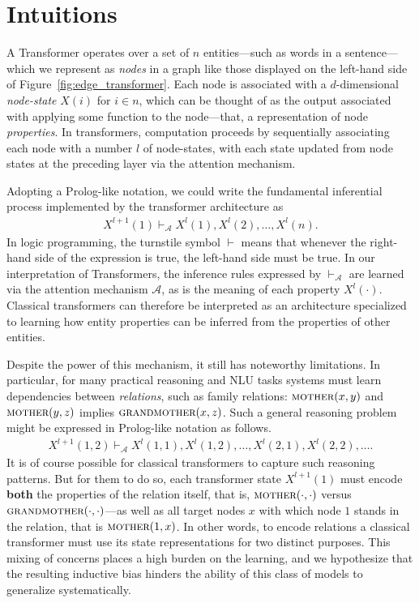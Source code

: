 \documentclass{article}
\newcommand{\fm}[1]{\textit{#1}}
\begin{document}
 \section{Intuitions}

 A Transformer operates over a set of $n$ entities---such as words in
 a sentence---which we represent as \fm{nodes} in a graph like those
 displayed on the left-hand side of
 Figure~\ref{fig:edge_transformer}. Each node is associated with a
 $d$-dimensional \fm{node-state} $X(i)$ for $i \in n$, which can be
 thought of as the output associated with applying some function to
 the node---that, a representation of node \fm{properties}. In
 transformers, computation proceeds by sequentially associating each
 node with a number $l$ of node-states, with each state updated from
 node states at the preceding layer via the attention mechanism.

 Adopting a Prolog-like notation, we could write the fundamental
 inferential process implemented by the transformer architecture as
\begin{align}
    X^{l +1}(1) \vdash_\mathcal{A} X^{l}(1), X^{l}(2), \dots, X^{l}(n).
    \label{eq:label1}
\end{align}
In logic programming, the turnstile symbol $\vdash$
means that whenever the right-hand side of the expression is true, the
left-hand side must be true. In our interpretation of Transformers,
the inference rules expressed by $\vdash_{\mathcal{A}}$ are learned
via the attention mechanism $\mathcal{A}$, as is the meaning of each
property $X^l(\cdot)$. Classical transformers can therefore be
interpreted as an architecture specialized to learning how entity
properties can be inferred from the properties of other entities.

Despite the power of this mechanism, it still has noteworthy
limitations. In particular, for many practical reasoning and NLU tasks
systems must learn dependencies between \textit{relations}, such as family
relations: $\textsc{mother}(x,y)$ and $\textsc{mother}(y,z)$ implies
$\textsc{grandmother}(x,z)$. Such a general reasoning problem might be
expressed in Prolog-like notation as follows.
\begin{align}
    X^{l +1}(1, 2) \vdash_\mathcal{A} X^{l}(1,1),  X^{l}(1,2),  \dots, X^{l}(2,1),  X^{l}(2,2), \dots.
    \label{eq:label1}
\end{align}
It is of course possible for classical transformers to capture such
reasoning patterns. But for them to do so, each transformer state
$X^{l +1}(1)$ must encode \textbf{both} the properties of the relation
itself, that is, $\textsc{mother}(\cdot,\cdot)$ versus
$\textsc{grandmother}(\cdot,\cdot)$---as well as all target nodes $x$
with which node $1$ stands in the relation, that is
$\textsc{mother}(1,x)$. In other words, to encode relations a
classical transformer must use its state representations for two
distinct purposes. This mixing of concerns places a high burden on the
learning, and we hypothesize that the resulting inductive bias hinders
the ability of this class of models to generalize systematically.
\end{document}
